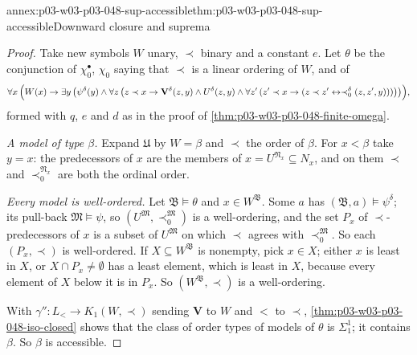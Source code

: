 \begin{annexitem}{annex:p03-w03-p03-048-sup-accessible}{thm:p03-w03-p03-048-sup-accessible}{Downward closure and suprema}
\begin{proof}
Take new symbols \(W\) unary, \(\prec\) binary and a constant \(e\).  Let
\(\theta\) be the conjunction of \(\chi_0^{\bullet}\), \(\chi_0\) saying
that \(\prec\) is a linear ordering of \(W\), and of
\[
\forall x\,\Bigl(W(x)\to\exists y\,\bigl(\psi^{\delta}(y)\land\forall z\,
\bigl(z\prec x\to\mathbf V^{\delta}(z,y)\land U^{\delta}(z,y)\land
\forall z'\,(z'\prec x\to(z\prec z'\leftrightarrow
\prec_0^{\delta}(z,z',y)))\bigr)\bigr)\Bigr),
\]
formed with \(q\), \(e\) and \(d\) as in the proof of
\cref{thm:p03-w03-p03-048-finite-omega}.

\emph{A model of type \(\beta\).}  Expand \(\mathfrak U\) by \(W=\beta\) and
\(\prec\) the order of \(\beta\).  For \(x<\beta\) take \(y=x\): the
predecessors of \(x\) are the members of \(x=U^{\mathfrak N_x}\subseteq
N_x\), and on them \(\prec\) and \(\prec_0^{\mathfrak N_x}\) are both the
ordinal order.

\emph{Every model is well-ordered.}  Let \(\mathfrak B\models\theta\) and
\(x\in W^{\mathfrak B}\).  Some \(a\) has \((\mathfrak B,a)\models
\psi^{\delta}\); its pull-back \(\mathfrak M\models\psi\), so
\((U^{\mathfrak M},\prec_0^{\mathfrak M})\) is a well-ordering, and the
set \(P_x\) of \(\prec\)-predecessors of \(x\) is a subset of
\(U^{\mathfrak M}\) on which \(\prec\) agrees with \(\prec_0^{\mathfrak M}\).
So each \((P_x,\prec)\) is well-ordered.  If \(X\subseteq W^{\mathfrak B}\)
is nonempty, pick \(x\in X\); either \(x\) is least in \(X\), or
\(X\cap P_x\neq\emptyset\) has a least element, which is least in \(X\),
because every element of \(X\) below it is in \(P_x\).  So
\((W^{\mathfrak B},\prec)\) is a well-ordering.

With \(\gamma'':L_{<}\to K_1(W,\prec)\) sending \(\mathbf V\) to \(W\) and
\(<\) to \(\prec\), \cref{thm:p03-w03-p03-048-iso-closed} shows that the
class of order types of models of \(\theta\) is \(\Sigma^1_1\); it contains
\(\beta\).  So \(\beta\) is accessible.
\end{proof}
\end{annexitem}

